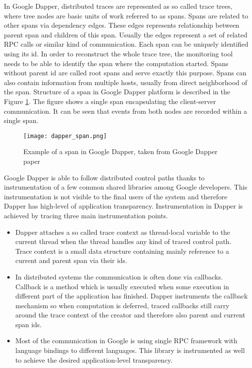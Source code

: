 In Google Dapper, distributed traces are represented as so called trace trees, where tree nodes are basic units of work referred to as spans. Spans are related to other spans via dependency edges. These edges represents relationship between parent span and children of this span. Usually the edges represent a set of related RPC calls or similar kind of communication. Each span can be uniquely identified using its id. In order to reconstruct the whole trace tree, the monitoring tool needs to be able to identify the span where the computation started. Spans without parent id are called root spans and serve exactly this purpose. Spans can also contain information from multiple hosts, usually from direct neighborhood of the span. Structure of a span in Google Dapper platform is described in the Figure \ref{fig:dapper_span}. The figure shows a single span encapsulating the client-server communication. It can be seen that events from both nodes are recorded within a single span.
\begin{figure}
	\centering
		\texttt{[image: dapper\_span.png]}
	\caption{Example of a span in Google Dapper, taken from Google Dapper paper \cite{DapperPaper}}
	\label{fig:dapper_span}
\end{figure}

Google Dapper is able to follow distributed control paths thanks to instrumentation of a few common shared libraries among Google developers. This instrumentation is not visible to the final users of the system and therefore Dapper has high-level of application transparency. Instrumentation in Dapper is achieved by tracing three main instrumentation points. 
\begin{itemize}
	\item Dapper attaches a so called trace context as thread-local variable to the current thread when the thread handles any kind of traced control path. Trace context is a small data structure containing mainly reference to a current and parent span via their ids.
	
	\item In distributed systems the communication is often done via callbacks. Callback is a method which is usually executed when some execution in different part of the application has finished. Dapper instruments the callback mechanism so when computation is deferred, traced callbacks still carry around the trace context of the creator and therefore also parent and current span ids.
	
	\item Most of the communication in Google is using single RPC framework with language bindings to different languages. This library is instrumented as well to achieve the desired application-level transparency.
\end{itemize}

